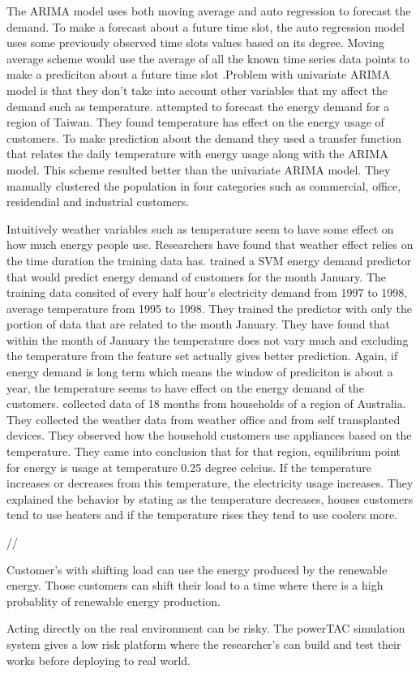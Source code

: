 The ARIMA model uses both moving average and auto regression to forecast the demand. To make a forecast about a future time slot, the auto regression model uses some previously observed time slots values based on its degree. Moving average scheme would use the average of all the known time series data points to make a prediciton about a future time slot .Problem with univariate ARIMA model is that they don't take into account other variables that my affect the demand such as temperature. \cite{cho1995customer} attempted to forecast the energy demand for a region of Taiwan. They found temperature has effect on the energy usage of customers. To make prediction about the demand they used a transfer function that relates the daily temperature with energy usage along with the ARIMA model. This scheme resulted better than the univariate ARIMA model. They manually clustered the population in four categories such as commercial, office, residendial and industrial customers. 

Intuitively weather variables such as temperature seem to have some effect on how much energy people use. Researchers have found that weather effect relies on the time duration the training data has. \cite{chen2004load} trained a SVM energy demand predictor that would predict energy demand of customers for the month January. The training data consited of every half hour's electricity demand from 1997 to 1998, average temperature from 1995 to 1998. They trained the predictor with only the portion of data that are related to the month January. They have found that within the month of January the temperature does not vary much and excluding the temperature from the feature set actually gives better prediction. Again, if energy demand is long term which means the window of prediciton is about a year, the temperature seems to have effect on the energy demand of the customers. \cite{hart2004weather} collected data of 18 months from households of a region of Australia. They collected the weather data from weather office and from self transplanted devices. They observed how the household customers use appliances based on the temperature. They came into conclusion that for that region, equilibrium point for energy is usage at temperature 0.25 degree celcius. If the temperature increases or decreases from this temperature, the electricity usage increases. They explained the behavior by stating as the temperature decreases, houses customers tend to use heaters and if the temperature rises they tend to use coolers more.

 //


Customer's with shifting load can use the energy produced by the renewable energy. Those customers can shift their load to a time where there is a high probablity of renewable energy production. 

Acting directly on the real environment can be risky. The powerTAC simulation system gives a low risk platform where the researcher's can build and test their works before deploying to real world. 